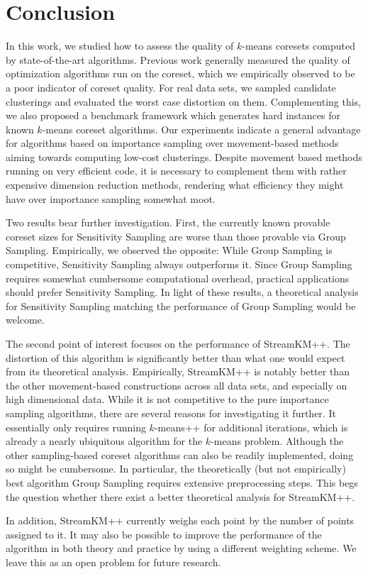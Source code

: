 \section{Conclusion} \label{sec:conclusion}
In this work, we studied how to assess the quality of $k$-means coresets computed by state-of-the-art algorithms. 
Previous work generally measured the quality of optimization algorithms run on the coreset, which we empirically observed to be a poor indicator of coreset quality.
For real data sets, we sampled candidate clusterings and evaluated the worst case distortion on them. Complementing this, we also proposed a benchmark framework which generates hard instances for known $k$-means coreset algorithms. Our experiments indicate a general advantage for algorithms based on importance sampling over movement-based methods aiming towards computing low-cost clusterings.
Despite movement based methods running on very efficient code, it is necessary to complement them with rather expensive dimension reduction methods, rendering what efficiency they might have over importance sampling somewhat moot.

Two results bear further investigation. First, the currently known provable coreset sizes for Sensitivity Sampling are worse than those provable via Group Sampling. Empirically, we observed the opposite: While Group Sampling is competitive, Sensitivity Sampling always outperforms it. Since Group Sampling requires somewhat cumbersome computational overhead, practical applications should prefer Sensitivity Sampling. In light of these results, a theoretical analysis for Sensitivity Sampling matching the performance of Group Sampling would be welcome.

The second point of interest focuses on the performance of StreamKM++. The distortion of this algorithm is significantly better than what one would expect from its theoretical analysis.
Empirically, StreamKM++ is notably better than the other movement-based constructions across all data sets, and especially on high dimensional data.
While it is not competitive to the pure importance sampling algorithms, there are several reasons for investigating it further. It essentially only requires running $k$-means++ for additional iterations, which is already a nearly ubiquitous algorithm for the $k$-means problem. Although the other sampling-based coreset algorithms can also be readily implemented, doing so might be cumbersome. In particular, the theoretically (but not empirically) best algorithm Group Sampling requires extensive preprocessing steps.
This begs the question whether there exist a better theoretical analysis for StreamKM++.

In addition, StreamKM++ currently weighs each point by the number of points assigned to it. It may also be possible to improve the performance of the algorithm in both theory and practice by using a different weighting scheme. 
We leave this as an open problem for future research.
